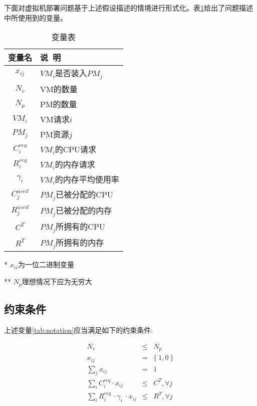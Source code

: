 下面对虚拟机部署问题基于上述假设描述的情境进行形式化。表\ref{tab:notation}给出了问题描述中所使用到的变量。


\begin{table}[htbp]

  \centering
  \begin{threeparttable}
    \caption{\label{tab:notation}变量表}
    \begin{tabular}{cl}
      \toprule
        变量名  &  说~明  \\
      \midrule
        $x_{ij}$    &  $VM_i$是否装入$PM_j$    \\
        $N_v$      &  VM的数量    \\
        $N_p$      &  PM的数量    \\
        $VM_i$     &  VM请求$i$  \\
        $PM_j$     &  PM资源$j$     \\
        $C^{req}_i$  &  $VM_i$的CPU请求 \\
        $R^{req}_i$  & $VM_i$的内存请求 \\
        $\gamma_i$  & $VM_i$的内存平均使用率 \\
        $C^{used}_j$  & $PM_j$已被分配的CPU \\
        $R^{used}_j$  & $PM_j$已被分配的内存 \\
        $C^T$       & $PM_j$所拥有的CPU \\
        $R^T$       & $PM_j$所拥有的内存 \\
      \bottomrule
    \end{tabular}
    \tiny
    \begin{tablenotes}
    \item [*] $x_{ij}$为一位二进制变量
    \item [**]$N_p$理想情况下应为无穷大
    \end{tablenotes}

  \end{threeparttable}
\end{table}



\subsection*{约束条件}
\label{sec:constraints}
上述变量\eqref{tab:notation}应当满足如下的约束条件:

\begin{eqnarray}
  \label{eq:constraints}
  N_v &\leq& N_p \label{eq:con:1}\\
  x_{ij} &=& \{\ 1,0\ \} \label{eq:con:2}\\
  \sum_j x_{ij} &=& 1 \label{eq:con:3} \\
  \sum_i C^{req}_i \cdot x_{ij} &\leq& C^T , \forall j \label{eq:con:4}\\
  \sum_i R^{req}_i\ \cdot \gamma_i\ \cdot  x_{ij} &\leq& R^T , \forall j \label{eq:con:5}
\end{eqnarray}

